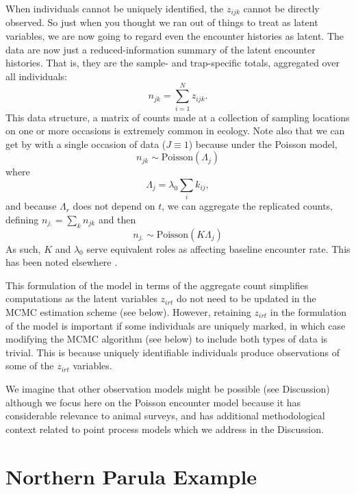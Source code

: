 When individuals cannot be uniquely identified, the $z_{ijk}$ cannot
be directly observed. So just when you thought we ran out of things to
treat as latent variables, we are now going to regard even the encounter
histories as latent. The data are now just a reduced-information
summary of the latent encounter histories. That is, they are the
sample- and trap-specific totals, aggregated over all individuals:
\[
n_{jk} = \sum_{i=1}^{N} z_{ijk}.
\]
This data structure, a matrix of counts made at a collection of
sampling locations on one or more occasions is extremely common in
ecology. Note also that we can get by with a single
occasion of data ($J \equiv 1$) because under the Poisson model,
\begin{equation}
n_{jk} \sim \mbox{Poisson}( \Lambda_{j} )
\label{eq:nagg}
\end{equation}
where
\[
 \Lambda_{j} = \lambda_0 \sum_{i} k_{ij},
\]
and because $\Lambda_r$ does not depend on $t$, we can
aggregate the replicated counts, defining
$n_{j.} = \sum_{k} n_{jk}$ and then
\[
 n_{j.} \sim \mbox{Poisson}( K \Lambda_{j} )
\]
As such, $K$ and $\lambda_{0}$ serve equivalent roles as affecting
baseline encounter rate. This has been noted elsewhere
\citep{efford_etal:2009}.


This formulation of the model in terms of the aggregate count
simplifies computations as the latent variables
$z_{irt}$ do not need to be updated in the MCMC estimation
scheme (see below). However, retaining $z_{irt}$
in the formulation of the model
is important if some individuals are uniquely marked, in which case
modifying
the MCMC algorithm (see below) to include both types of data is
trivial. This is because uniquely identifiable individuals produce
observations of some of the $z_{irt}$ variables.




We imagine that other observation models
might be possible (see Discussion) although we focus here on the
Poisson encounter model because it has considerable relevance to
animal surveys, and has additional methodological context related to
point process models which we address in the Discussion.







\section{Northern Parula Example}

